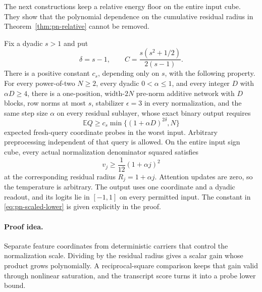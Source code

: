 The next constructions keep a relative energy floor on the entire input
cube. They show that the polynomial dependence on the cumulative
residual radius in Theorem~\ref{thm:pn-relative} cannot be removed.

\begin{theorem}
\label{thm:pn-scaled-lower}
Fix a dyadic $s>1$ and put
\[
 \delta=s-1,\qquad C=\frac{s(s^2+1/2)}{2(s-1)}.
\]
There is a positive constant $c_s$, depending only on $s$,
with the following property.
For every power-of-two $N\ge2$, every dyadic $0<\alpha\le1$, and every
integer $D$ with $\alpha D\ge4$, there is a one-position, width-$2N$
pre-norm additive network with $D$ blocks, row norms at most $s$,
stabilizer $\epsilon=3$ in every normalization, and the same step
size $\alpha$ on every residual sublayer, whose exact binary output
requires
\begin{equation}
 \mathbb E Q\ge
 c_s
 \min\{(1+\alpha D)^{2\delta},N\}
 \label{eq:pn-scaled-lower}
\end{equation}
expected fresh-query coordinate probes in the worst input. Arbitrary
preprocessing independent of that query is allowed. On the entire input sign cube, every actual
normalization denominator squared satisfies
\[
 v_j\ge\frac1{12}(1+\alpha j)^2
\]
at the corresponding residual radius $R_j=1+\alpha j$.
Attention updates are zero, so the temperature is arbitrary. The
output uses one coordinate and a dyadic readout, and its logits lie
in $[-1,1]$ on every permitted input. The constant in
\eqref{eq:pn-scaled-lower} is given explicitly in the proof.
\end{theorem}
\paragraph{Proof idea.}
Separate feature coordinates from deterministic carriers that
control the normalization scale. Dividing by the residual radius gives a
scalar gain whose product grows polynomially. A reciprocal-square comparison
keeps that gain valid through nonlinear saturation, and the transcript score
turns it into a probe lower bound.

